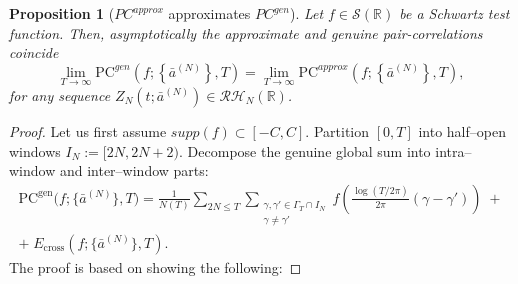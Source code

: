 \documentclass[12pt,reqno]{amsart}
\theoremstyle{plain}
\newtheorem{prop}{Proposition}[section]
\theoremstyle{definition}
\theoremstyle{remark}
\begin{document}
\begin{prop}[$PC^{approx}$ approximates $PC^{gen}$]
\label{prop:approx-vs-gen}
Let $f\in \mathcal{S}(\mathbb R)$ be a Schwartz test function. Then, asymptotically the approximate and genuine pair-correlations coincide 
\begin{equation}
\lim_{T\to\infty}\mathrm{PC}^{gen}(f;  \left \{ \bar a^{(N)} \right \}, T)=
\lim_{T\to\infty}\mathrm{PC}^{approx}(f;  \left \{ \bar a^{(N)} \right \} , T),
\end{equation}
for any sequence $Z_N(t; \bar a^{(N)}) \in \mathcal{RH}_N(\mathbb{R})$. 
\end{prop}
\begin{proof}
Let us first assume $supp(f) \subset [-C,C]$. Partition $[0,T]$ into half–open windows $I_N:=[2N,2N+2)$.
Decompose the genuine global sum into intra–window and inter–window parts:
\begin{multline}
\mathrm{PC}^{\mathrm{gen}}\!\bigl(f;\{\bar a^{(N)}\},T\bigr)
=\frac{1}{N(T)}\sum_{2N\le T}
\!\!\sum_{\substack{\gamma,\gamma'\in\Gamma_T\cap I_N\\ \gamma\ne\gamma'}}
f\!\left(\frac{\log(T/2\pi)}{2\pi}(\gamma-\gamma')\right)
\;+ \\ + \;E_{\mathrm{cross}}(f;\{\bar a^{(N)}\}, T).
\end{multline}
The proof is based on showing the following:


\end{proof}
\end{document}
